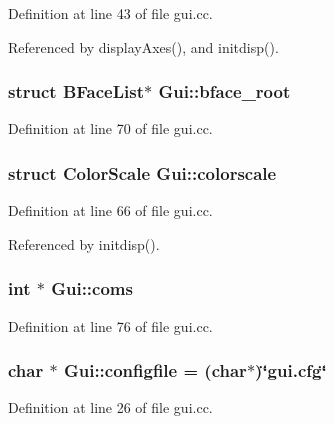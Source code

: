 Definition at line 43 of file gui.cc.

Referenced by displayAxes(), and initdisp().\hypertarget{namespaceGui_f84d6dd43874bce8629a513c3cbaff73}{
\subsubsection[{bface\_\-root}]{\setlength{\rightskip}{0pt plus 5cm}struct BFaceList$\ast$ {\bf Gui::bface\_\-root}}}
\label{namespaceGui_f84d6dd43874bce8629a513c3cbaff73}




Definition at line 70 of file gui.cc.\hypertarget{namespaceGui_4701d367312756fbf7b5f1950665a65a}{
\subsubsection[{colorscale}]{\setlength{\rightskip}{0pt plus 5cm}struct {\bf ColorScale} {\bf Gui::colorscale}}}
\label{namespaceGui_4701d367312756fbf7b5f1950665a65a}




Definition at line 66 of file gui.cc.

Referenced by initdisp().\hypertarget{namespaceGui_a46e6ad4b192cdaba9efb1ada2133df9}{
\subsubsection[{coms}]{\setlength{\rightskip}{0pt plus 5cm}int $\ast$ {\bf Gui::coms}}}
\label{namespaceGui_a46e6ad4b192cdaba9efb1ada2133df9}




Definition at line 76 of file gui.cc.\hypertarget{namespaceGui_6702af97844e9ea00bded3ffb073c223}{
\subsubsection[{configfile}]{\setlength{\rightskip}{0pt plus 5cm}char $\ast$ {\bf Gui::configfile} = (char$\ast$)\char`\"{}gui.cfg\char`\"{}}}
\label{namespaceGui_6702af97844e9ea00bded3ffb073c223}




Definition at line 26 of file gui.cc.

